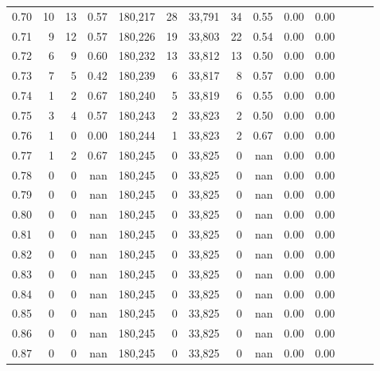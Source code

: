 \begin{tabular}{rrrrrrrrrrrrrr}
0.70 &      10 &     13 &  0.57 &  180,217 &       28 &  33,791 &      34 &  0.55 &  0.00 &      0.00 \\
0.71 &       9 &     12 &  0.57 &  180,226 &       19 &  33,803 &      22 &  0.54 &  0.00 &      0.00 \\
0.72 &       6 &      9 &  0.60 &  180,232 &       13 &  33,812 &      13 &  0.50 &  0.00 &      0.00 \\
0.73 &       7 &      5 &  0.42 &  180,239 &        6 &  33,817 &       8 &  0.57 &  0.00 &      0.00 \\
0.74 &       1 &      2 &  0.67 &  180,240 &        5 &  33,819 &       6 &  0.55 &  0.00 &      0.00 \\
0.75 &       3 &      4 &  0.57 &  180,243 &        2 &  33,823 &       2 &  0.50 &  0.00 &      0.00 \\
0.76 &       1 &      0 &  0.00 &  180,244 &        1 &  33,823 &       2 &  0.67 &  0.00 &      0.00 \\
0.77 &       1 &      2 &  0.67 &  180,245 &        0 &  33,825 &       0 &   nan &  0.00 &      0.00 \\
0.78 &       0 &      0 &   nan &  180,245 &        0 &  33,825 &       0 &   nan &  0.00 &      0.00 \\
0.79 &       0 &      0 &   nan &  180,245 &        0 &  33,825 &       0 &   nan &  0.00 &      0.00 \\
0.80 &       0 &      0 &   nan &  180,245 &        0 &  33,825 &       0 &   nan &  0.00 &      0.00 \\
0.81 &       0 &      0 &   nan &  180,245 &        0 &  33,825 &       0 &   nan &  0.00 &      0.00 \\
0.82 &       0 &      0 &   nan &  180,245 &        0 &  33,825 &       0 &   nan &  0.00 &      0.00 \\
0.83 &       0 &      0 &   nan &  180,245 &        0 &  33,825 &       0 &   nan &  0.00 &      0.00 \\
0.84 &       0 &      0 &   nan &  180,245 &        0 &  33,825 &       0 &   nan &  0.00 &      0.00 \\
0.85 &       0 &      0 &   nan &  180,245 &        0 &  33,825 &       0 &   nan &  0.00 &      0.00 \\
0.86 &       0 &      0 &   nan &  180,245 &        0 &  33,825 &       0 &   nan &  0.00 &      0.00 \\
0.87 &       0 &      0 &   nan &  180,245 &        0 &  33,825 &       0 &   nan &  0.00 &      0.00 \\

\end{tabular}
